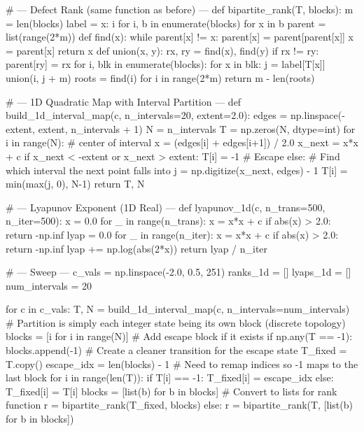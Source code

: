 {{{{{{{{{{{{{# --- Defect Rank (same function as before) ---
def bipartite_rank(T, blocks):
    m = len(blocks)
    label = {x: i for i, b in enumerate(blocks) for x in b}
    parent = list(range(2*m))
    def find(x):
        while parent[x] != x:
            parent[x] = parent[parent[x]]
            x = parent[x]
        return x
    def union(x, y):
        rx, ry = find(x), find(y)
        if rx != ry:
            parent[ry] = rx
    for i, blk in enumerate(blocks):
        for x in blk:
            j = label[T[x]]
            union(i, j + m)
    roots = {find(i) for i in range(2*m)}
    return m - len(roots)

# --- 1D Quadratic Map with Interval Partition ---
def build_1d_interval_map(c, n_intervals=20, extent=2.0):
    edges = np.linspace(-extent, extent, n_intervals + 1)
    N = n_intervals
    T = np.zeros(N, dtype=int)
    for i in range(N):
        # center of interval
        x = (edges[i] + edges[i+1]) / 2.0
        x_next = x*x + c
        if x_next < -extent or x_next > extent:
            T[i] = -1  # Escape
        else:
            # Find which interval the next point falls into
            j = np.digitize(x_next, edges) - 1
            T[i] = min(max(j, 0), N-1)
    return T, N

# --- Lyapunov Exponent (1D Real) ---
def lyapunov_1d(c, n_trans=500, n_iter=500):
    x = 0.0
    for _ in range(n_trans):
        x = x*x + c
        if abs(x) > 2.0: return -np.inf
    lyap = 0.0
    for _ in range(n_iter):
        x = x*x + c
        if abs(x) > 2.0: return -np.inf
        lyap += np.log(abs(2*x))
    return lyap / n_iter

# --- Sweep ---
c_vals = np.linspace(-2.0, 0.5, 251)
ranks_1d = []
lyaps_1d = []
num_intervals = 20

for c in c_vals:
    T, N = build_1d_interval_map(c, n_intervals=num_intervals)
    # Partition is simply each integer state being its own block (discrete topology)
    blocks = [{i} for i in range(N)] 
    # Add escape block if it exists
    if np.any(T == -1):
        blocks.append({-1})
        # Create a cleaner transition for the escape state
        T_fixed = T.copy()
        escape_idx = len(blocks) - 1
        # Need to remap indices so -1 maps to the last block
        for i in range(len(T)):
            if T[i] == -1:
                T_fixed[i] = escape_idx
            else:
                T_fixed[i] = T[i]
        blocks = [list(b) for b in blocks] # Convert to lists for rank function
        r = bipartite_rank(T_fixed, blocks)
    else:
        r = bipartite_rank(T, [list(b) for b in blocks])
    
}}}}}}}}}}}}}
